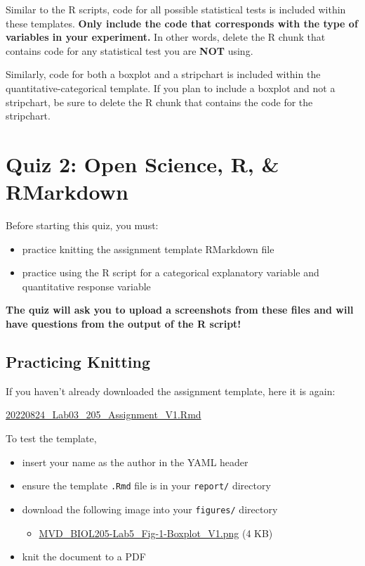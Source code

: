 \documentclass[
]{book}
\providecommand{\tightlist}{%
  \setlength{\itemsep}{0pt}\setlength{\parskip}{0pt}}
\begin{document}
Similar to the R scripts, code for all possible statistical tests is included within these templates. \textbf{Only include the code that corresponds with the type of variables in your experiment.} In other words, delete the R chunk that contains code for any statistical test you are \textbf{NOT} using.

Similarly, code for both a boxplot and a stripchart is included within the quantitative-categorical template. If you plan to include a boxplot and not a stripchart, be sure to delete the R chunk that contains the code for the stripchart.

\hypertarget{quiz-2-open-science-r-rmarkdown}{%
\chapter*{Quiz 2: Open Science, R, \& RMarkdown}\label{quiz-2-open-science-r-rmarkdown}}

Before starting this quiz, you must:

\begin{itemize}
\tightlist
\item
  practice knitting the assignment template RMarkdown file
\item
  practice using the R script for a categorical explanatory variable and quantitative response variable
\end{itemize}

\textbf{The quiz will ask you to upload a screenshots from these files and will have questions from the output of the R script!}

\hypertarget{practicing-knitting}{%
\section*{Practicing Knitting}\label{practicing-knitting}}

If you haven't already downloaded the assignment template, here it is again:

\href{https://osf.io/download/g5zxk}{20220824\_Lab03\_205\_Assignment\_V1.Rmd}

To test the template,

\begin{itemize}
\tightlist
\item
  insert your name as the author in the YAML header
\item
  ensure the template \texttt{.Rmd} file is in your \texttt{report/} directory
\item
  download the following image into your \texttt{figures/} directory

  \begin{itemize}
  \tightlist
  \item
    \href{https://osf.io/download/zuehg}{MVD\_BIOL205-Lab5\_Fig-1-Boxplot\_V1.png} (4 KB)
  \end{itemize}
\item
  knit the document to a PDF
\end{itemize}
\end{document}

